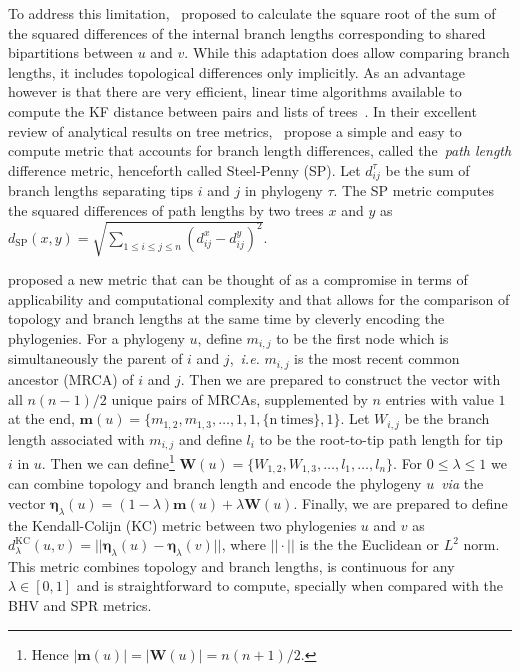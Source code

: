 To address this limitation,~\cite{Kuhner1994} proposed to calculate the square root of the sum of the squared differences of the internal branch lengths corresponding to shared bipartitions between $u$ and $v$.
While this adaptation does allow comparing branch lengths, it includes topological differences only implicitly.
As an advantage however is that there are very efficient, linear time algorithms available to compute the KF distance between pairs and lists of trees~\citep{Pattengale2007}.
In their excellent review of analytical results on tree metrics,~\cite{Steel1993} propose a simple and easy to compute metric that accounts for branch length differences, called the~\textit{path length} difference metric, henceforth called Steel-Penny (SP).
Let $d_{ij}^\tau$ be the sum of branch lengths separating tips $i$ and $j$ in phylogeny $\tau$. 
The SP metric computes the squared differences of path lengths by two trees $x$ and $y$ as $d_{\text{SP}}(x, y) = \sqrt{\sum_{1 \leq i \leq j \leq n} (d_{ij}^x - d_{ij}^y)^2 }$.

\cite{Kendall2016} proposed a new metric that can be thought of as a compromise in terms of applicability and computational complexity and that allows for the comparison of topology and branch lengths at the same time by cleverly encoding the phylogenies.
For a phylogeny $u$, define $m_{i,j}$ to be the first node which is simultaneously the parent of $i$ and $j$,~\textit{i.e.}  $m_{i,j}$ is the most recent common ancestor (MRCA) of $i$ and $j$.
Then we are prepared to construct the vector with all $n(n-1)/2$ unique pairs of MRCAs, supplemented by $n$ entries with value $1$ at the end,  $\boldsymbol m(u) = \{ m_{1,2}, m_{1, 3}, \ldots, 1, 1, \{ $n$\:\text{times} \}, 1 \}$.
Let $W_{i,j}$ be the branch length associated with $m_{i,j}$ and define $l_i$ to be the root-to-tip path length for tip $i$ in $u$.
Then we can define\footnote{Hence $|\boldsymbol m(u)| = |\boldsymbol W(u)| = n(n+1)/2$.} $\boldsymbol W(u) = \{W_{1,2}, W_{1,3}, \ldots, l_1, \ldots, l_n \}$.
For $ 0 \leq \lambda  \leq 1$ we can combine topology and branch length and encode the phylogeny $u$~\textit{via} the vector $\boldsymbol\eta_\lambda(u) = (1-\lambda)\boldsymbol m(u) + \lambda \boldsymbol W(u)$.
Finally, we are prepared to define the Kendall-Colijn (KC) metric between two phylogenies $u$ and $v$ as $d_\lambda^{\text{KC}}(u, v) = ||\boldsymbol\eta_\lambda(u) -\boldsymbol\eta_\lambda(v)||$, where $||\cdot||$ is the the Euclidean or $L^2$ norm.
This metric combines topology and branch lengths, is continuous for any $\lambda \in [0, 1]$ and is straightforward to compute, specially when compared with the BHV and SPR metrics.

